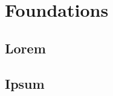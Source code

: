 \documentclass[oneside,11pt]{memoir}
\begin{document}

\part{Foundations}



\chapter{Lorem}

\cite{arxiv-1907.07174}

\lipsum[1-10]

\chapter{Ipsum}

\end{document}
